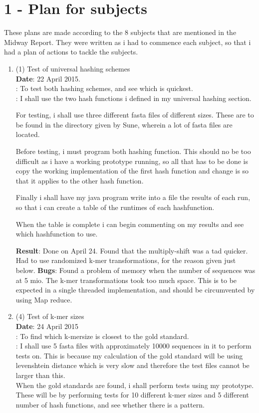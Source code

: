 \documentclass[../../main.tex]{subfiles}
\begin{document}
\section*{1 - Plan for subjects}
These plans are made according to the 8 subjects that are mentioned in the Midway Report. They were written as i had to commence each subject, so that i had a plan of actions to tackle the subjects.
\begin{enumerate}
\item (1) Test of universal hashing schemes\\
{\bf Date}: 22 April 2015.\\
: To test both hashing schemes, and see which is quickest.\\
: I shall use the two hash functions i defined in my universal hashing section.

For testing, i shall use three different fasta files of different sizes. These are to be found in the directory given by Sune, wherein a lot of fasta files are located. 

Before testing, i must program both hashing function. This should no be too difficult as i have a working prototype running, so all that has to be done is copy the working implementation of the first hash function and change is so that it applies to the other hash function. 

Finally i shall have my java program write into a file the results of each run, so that i can create a table of the runtimes of each hashfunction. 

When the table is complete i can begin commenting on my results and see which hashfunction to use.


{\bf Result}: Done on April 24. Found that the multiply-shift was a tad quicker. Had to use randomized k-mer transformations, for the reason given just below.
{\bf Bugs}: Found a problem of memory when the number of sequences was at 5 mio. The k-mer transformations took too much space. This is to be expected in a single threaded implementation, and should be circumvented by using Map reduce. 

\item (4) Test of k-mer sizes\\
{\bf Date}: 24 April 2015\\
: To find which k-mersize is closest to the gold standard.\\
: I shall use 5 fasta files with approximately 10000 sequences in it to perform tests on. This is because my calculation of the gold standard will be using levenshtein distance which is very slow and therefore the test files cannot be larger than this.\\

When the gold standards are found, i shall perform tests using my prototype. These will be by performing tests for 10 different k-mer sizes and 5 different number of hash functions, and see whether there is a pattern.\\


\end{enumerate}
\end{document}
